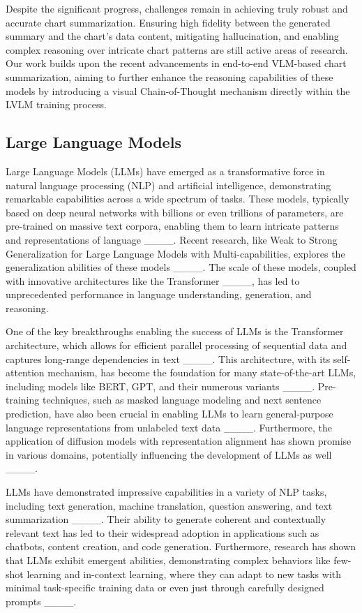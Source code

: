 Despite the significant progress, challenges remain in achieving truly robust and accurate chart summarization. Ensuring high fidelity between the generated summary and the chart's data content, mitigating hallucination, and enabling complex reasoning over intricate chart patterns are still active areas of research. Our work builds upon the recent advancements in end-to-end VLM-based chart summarization, aiming to further enhance the reasoning capabilities of these models by introducing a visual Chain-of-Thought mechanism directly within the LVLM training process.

\subsection{Large Language Models}

Large Language Models (LLMs) have emerged as a transformative force in natural language processing (NLP) and artificial intelligence, demonstrating remarkable capabilities across a wide spectrum of tasks. These models, typically based on deep neural networks with billions or even trillions of parameters, are pre-trained on massive text corpora, enabling them to learn intricate patterns and representations of language ____.  Recent research, like Weak to Strong Generalization for Large Language Models with Multi-capabilities, explores the generalization abilities of these models ____. The scale of these models, coupled with innovative architectures like the Transformer ____, has led to unprecedented performance in language understanding, generation, and reasoning.

One of the key breakthroughs enabling the success of LLMs is the Transformer architecture, which allows for efficient parallel processing of sequential data and captures long-range dependencies in text ____. This architecture, with its self-attention mechanism, has become the foundation for many state-of-the-art LLMs, including models like BERT, GPT, and their numerous variants ____.  Pre-training techniques, such as masked language modeling and next sentence prediction, have also been crucial in enabling LLMs to learn general-purpose language representations from unlabeled text data ____.  Furthermore, the application of diffusion models with representation alignment has shown promise in various domains, potentially influencing the development of LLMs as well ____.

LLMs have demonstrated impressive capabilities in a variety of NLP tasks, including text generation, machine translation, question answering, and text summarization ____. Their ability to generate coherent and contextually relevant text has led to their widespread adoption in applications such as chatbots, content creation, and code generation. Furthermore, research has shown that LLMs exhibit emergent abilities, demonstrating complex behaviors like few-shot learning and in-context learning, where they can adapt to new tasks with minimal task-specific training data or even just through carefully designed prompts ____.

